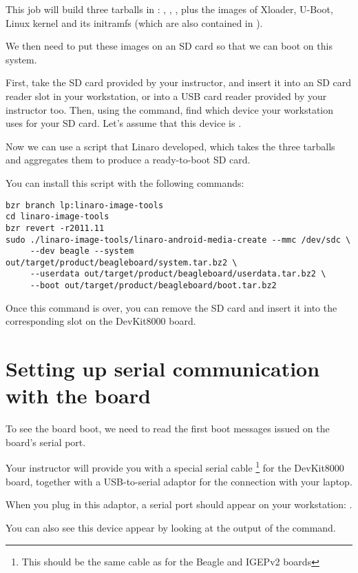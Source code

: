 This job will build three tarballs in
: ,
, , plus the images of
Xloader, U-Boot, Linux kernel and its initramfs (which are also
contained in ).

We then need to put these images on an SD card so that we can boot on
this system.

First, take the SD card provided by your instructor, and insert it
into an SD card reader slot in your workstation, or into a USB card
reader provided by your instructor too. Then, using the 
command, find which device your workstation uses for your SD card.
Let's assume that this device is .

Now we can use a  script that Linaro
developed, which takes the three tarballs and aggregates them to
produce a ready-to-boot SD card.

You can install this script with the following commands:

\begin{verbatim}
bzr branch lp:linaro-image-tools
cd linaro-image-tools
bzr revert -r2011.11
sudo ./linaro-image-tools/linaro-android-media-create --mmc /dev/sdc \
     --dev beagle --system out/target/product/beagleboard/system.tar.bz2 \
     --userdata out/target/product/beagleboard/userdata.tar.bz2 \
     --boot out/target/product/beagleboard/boot.tar.bz2
\end{verbatim}

Once this command is over, you can remove the SD card and insert it
into the corresponding slot on the DevKit8000 board.

\section{Setting up serial communication with the board}

To see the board boot, we need to read the first boot messages issued
on the board's serial port.

Your instructor will provide you with a special serial cable
\footnote{This should be the same cable as for the Beagle and IGEPv2
  boards} for the DevKit8000 board, together with a USB-to-serial
adaptor for the connection with your laptop.

When you plug in this adaptor, a serial port should appear on your
workstation: \code{/dev/ttyUSB0}.

You can also see this device appear by looking at the output of the
\code{dmesg} command.

